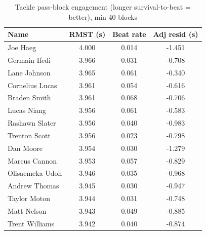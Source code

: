 \begin{table}[h!]
\centering
\footnotesize
\begin{tabular}{lccc}
\toprule
Name & RMST (s) & Beat rate & Adj resid (s) \\
\midrule
Joe Haeg & 4.000 & 0.014 & -1.451 \\
Germain Ifedi & 3.966 & 0.031 & -0.708 \\
Lane Johnson & 3.965 & 0.061 & -0.340 \\
Cornelius Lucas & 3.961 & 0.054 & -0.616 \\
Braden Smith & 3.961 & 0.068 & -0.706 \\
Lucas Niang & 3.956 & 0.061 & -0.583 \\
Rashawn Slater & 3.956 & 0.040 & -0.983 \\
Trenton Scott & 3.956 & 0.023 & -0.798 \\
Dan Moore & 3.954 & 0.030 & -1.279 \\
Marcus Cannon & 3.953 & 0.057 & -0.829 \\
Olisaemeka Udoh & 3.946 & 0.035 & -0.968 \\
Andrew Thomas & 3.945 & 0.030 & -0.947 \\
Taylor Moton & 3.944 & 0.031 & -0.748 \\
Matt Nelson & 3.943 & 0.049 & -0.885 \\
Trent Williams & 3.942 & 0.040 & -0.874 \\
\bottomrule
\end{tabular}
\caption{Tackle pass-block engagement (longer survival-to-beat = better), min 40 blocks}
\label{tab:block_engagement}
\end{table}
